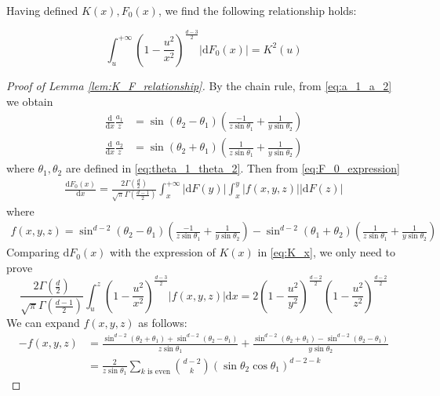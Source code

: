 \documentclass{aptpub}
\def\d{\mathrm{d}}
\begin{document}
Having defined $K(x), F_0(x)$, we find the following relationship holds:
\begin{lemma}\label{lem:K_F_relationship}
\begin{equation}\label{eq:F_0_integration}
     \int_u^{+\infty}
     (1-\frac{u^2}{x^2})^{\frac{d-3}{2}} |\d F_0(x)| = K^2(u)
\end{equation}
\end{lemma}
\begin{proof}[Proof of Lemma \ref{lem:K_F_relationship}]
     By the chain rule, from \eqref{eq:a_1_a_2} we obtain
\begin{align*}
    \frac{\d}{\d x}\frac{a_1}{z} &
    = \sin(\theta_2 - \theta_1)
    \left(\frac{-1}{z\sin\theta_1}
    +\frac{1}{y\sin \theta_2}\right)\\
    \frac{\d}{\d x}\frac{a_2}{z} &
    = \sin(\theta_2 + \theta_1)
    \left(\frac{1}{z\sin\theta_1}
    +\frac{1}{y\sin \theta_2}\right)
\end{align*}
where $\theta_1, \theta_2$ are defined in \eqref{eq:theta_1_theta_2}.
Then from \eqref{eq:F_0_expression}
\begin{align*}
    \frac{\d F_0(x)}{\d x}  =\frac{2\Gamma(\frac{d}{2})}
    {\sqrt{\pi}\Gamma(\frac{d-1}{2})}
    \int_x^{+\infty} |\d F(y)| \int_x^y |f(x,y,z)| |\d F(z)| 
\end{align*}
where
\begin{align*}
    f(x,y,z) = \sin^{d-2} (\theta_2 - \theta_1)
    \left(\frac{-1}{z\sin\theta_1}
    +\frac{1}{y\sin \theta_2}\right)
    - \sin^{d-2}(\theta_1 + \theta_2)
    \left(\frac{1}{z\sin\theta_1}
    +\frac{1}{y\sin \theta_2}\right)
\end{align*}
Comparing $\d F_0(x)$
with the expression of $K(x)$ in
\eqref{eq:K_x},
we only need to prove
\begin{equation}\label{eq:ref_prove_integration}    
    \frac{2\Gamma(\frac{d}{2})}
    {\sqrt{\pi}\Gamma(\frac{d-1}{2})}
    \int_u^z (1-\frac{u^2}{x^2})^{\frac{d-3}{2}}
    |f(x,y,z)|\d x =
    2(1-\frac{u^2}{y^2})^{\frac{d-2}{2}}
    (1-\frac{u^2}{z^2})^{\frac{d-2}{2}}
\end{equation}
We can expand $f(x,y,z)$ as follows:
\begin{align*}
-f(x,y,z)&=\frac{\sin^{d-2}(\theta_2+\theta_1)
+ \sin^{d-2}(\theta_2 - \theta_1)}{z\sin\theta_1}
+\frac{\sin^{d-2}(\theta_2+\theta_1)
- \sin^{d-2}(\theta_2 - \theta_1)}{y\sin\theta_2} \\
&=\frac{2}{z\sin\theta_1}\sum_{k \textrm{ is even}}
\binom{d-2}{k} (\sin\theta_2\cos\theta_1)^{d-2-k}

\end{align*}
\end{proof}
\end{document}
